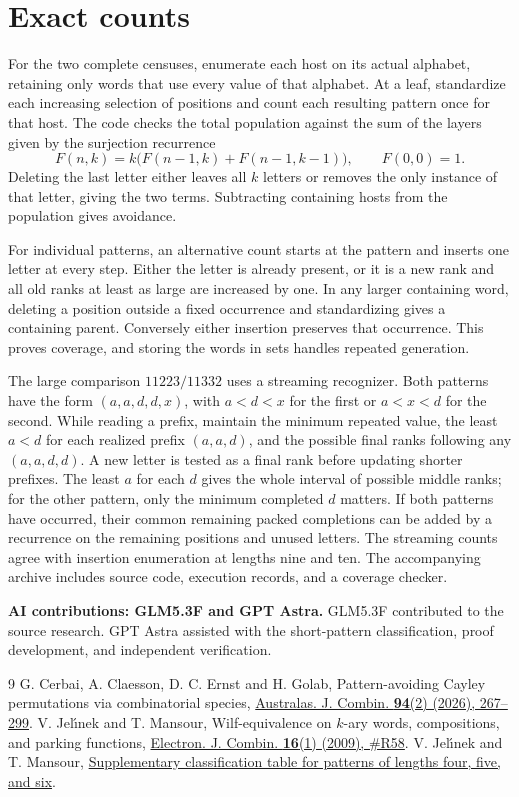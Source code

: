 \documentclass[10pt]{article}
\begin{document}
\section{Exact counts}
For the two complete censuses, enumerate each host on its actual
alphabet, retaining only words that use every value of that alphabet.
At a leaf, standardize each increasing selection of positions and count
each resulting pattern once for that host. The code checks the total
population against the sum of the layers given by the surjection recurrence
\[
 F(n,k)=k\bigl(F(n-1,k)+F(n-1,k-1)\bigr), \qquad F(0,0)=1.
\]
Deleting the last letter either leaves all $k$ letters or removes the
only instance of that letter, giving the two terms. Subtracting containing
hosts from the population gives avoidance.

For individual patterns, an alternative count starts at the pattern
and inserts one letter at every step. Either the letter is already
present, or it is a new rank and all old ranks at least as large are
increased by one. In any larger containing word, deleting a position
outside a fixed occurrence and standardizing gives a containing parent.
Conversely either insertion preserves that occurrence. This proves
coverage, and storing the words in sets handles repeated generation.

The large comparison $11223/11332$ uses a streaming recognizer.
Both patterns have the form $(a,a,d,d,x)$, with $a<d<x$ for the first
or $a<x<d$ for the second. While reading a prefix, maintain the minimum
repeated value, the least $a<d$ for each realized prefix $(a,a,d)$,
and the possible final ranks following any $(a,a,d,d)$. A new letter is
tested as a final rank before updating shorter prefixes. The least $a$
for each $d$ gives the whole interval of possible middle ranks; for the
other pattern, only the minimum completed $d$ matters. If both patterns
have occurred, their common remaining packed completions can be added
by a recurrence on the remaining positions and unused letters.
The streaming counts agree with insertion enumeration at lengths
nine and ten. The accompanying archive includes source code, execution
records, and a coverage checker.

\textbf{AI contributions: GLM5.3F and GPT Astra.}
GLM5.3F contributed to the source research. GPT Astra assisted with the
short-pattern classification, proof development, and independent verification.

\begin{thebibliography}{9}
 G. Cerbai, A. Claesson, D. C. Ernst and H. Golab,
Pattern-avoiding Cayley permutations via combinatorial species,
\href{https://ajc.maths.uq.edu.au/pdf/94/ajc_v94_p267.pdf}
{Australas. J. Combin. \textbf{94}(2) (2026), 267--299}.
 V. Jel\'{\i}nek and T. Mansour, Wilf-equivalence on $k$-ary words,
compositions, and parking functions,
\href{https://doi.org/10.37236/147}{Electron. J. Combin. \textbf{16}(1) (2009), \#R58}.
 V. Jel\'{\i}nek and T. Mansour,
\href{https://math.haifa.ac.il/toufik/enumerative/tablewords456.html}
{Supplementary classification table for patterns of lengths four, five, and six}.
\end{thebibliography}
\end{document}
